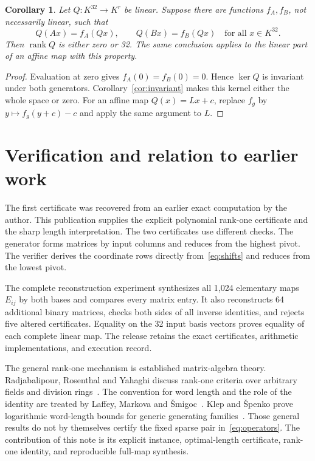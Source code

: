 \documentclass[11pt,a4paper]{article}
\newtheorem{corollary}[theorem]{Corollary}
\theoremstyle{definition}\newtheorem{definition}[theorem]{Definition}
\DeclareMathOperator{\rank}{rank}
\begin{document}
\begin{corollary}\label{cor:quotient}
Let $Q:K^{32}\to K^r$ be linear. Suppose there are functions $f_A,f_B$,
not necessarily linear, such that
\[
 Q(Ax)=f_A(Qx),\qquad Q(Bx)=f_B(Qx)\quad\text{for all }x\in K^{32}.
\]
Then $\rank Q$ is either zero or 32. The same conclusion applies to the
linear part of an affine map with this property.
\end{corollary}
\begin{proof}
Evaluation at zero gives $f_A(0)=f_B(0)=0$. Hence $\ker Q$ is invariant
under both generators. Corollary~\ref{cor:invariant} makes this kernel
either the whole space or zero. For an affine map $Q(x)=Lx+c$, replace
$f_g$ by $y\mapsto f_g(y+c)-c$ and apply the same argument to $L$.
\end{proof}

\section{Verification and relation to earlier work}
The first certificate was recovered from an earlier exact computation by
the author. This publication supplies the explicit polynomial rank-one
certificate and the sharp length interpretation. The two certificates
use different checks. The generator forms matrices by input columns and
reduces from the highest pivot. The verifier derives the coordinate rows
directly from~\eqref{eq:shifts} and reduces from the lowest pivot.

The complete reconstruction experiment synthesizes all 1,024 elementary
maps $E_{ij}$ by both bases and compares every matrix entry. It also
reconstructs 64 additional binary matrices, checks both sides of all
inverse identities, and rejects five altered certificates. Equality on
the 32 input basis vectors proves equality of each complete linear map.
The release retains the exact certificates, arithmetic implementations,
and execution record.

The general rank-one mechanism is established matrix-algebra theory.
Radjabalipour, Rosenthal and Yahaghi discuss rank-one criteria over arbitrary
fields and division rings~\cite{radjabalipour}. The convention for word
length and the role of the identity are treated by Laffey, Markova and
\v{S}migoc~\cite{laffey}. Klep and \v{S}penko prove logarithmic word-length
bounds for generic generating families~\cite{klep}. Those general results
do not by themselves certify the fixed sparse pair in~\eqref{eq:operators}.
The contribution of this note is its explicit instance, optimal-length
certificate, rank-one identity, and reproducible full-map synthesis.
\end{document}
